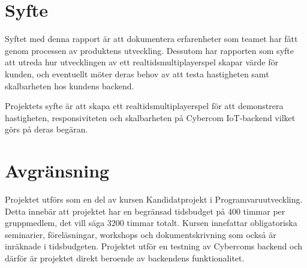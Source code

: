\section{Syfte}
\label{sec:aim}
Syftet med denna rapport är att dokumentera erfarenheter som teamet har fått genom processen av produktens utveckling. Dessutom har rapporten som syfte att utreda hur utvecklingen av ett realtidsmultiplayerspel skapar värde för kunden, och eventuellt möter deras behov av att testa hastigheten samt skalbarheten hos kundens backend.

Projektets syfte är att skapa ett realtidsmultiplayerspel för att demonstrera hastigheten, responsiviteten och skalbarheten på Cybercom IoT-backend vilket görs på deras begäran.
\section{Avgränsning}

\label{sec:delimitations}

Projektet utförs som en del av kursen Kandidatprojekt i Programvaruutveckling. Detta innebär att projektet har en begränsad tidsbudget på 400 timmar per gruppmedlem, det vill säga 3200 timmar totalt. Kursen innefattar obligatoriska seminarier, föreläsningar, workshops och dokumentskrivning som också är inräknade i tidsbudgeten. Projektet utför en testning av Cybercoms backend och därför är projektet direkt beroende av backendens funktionalitet.
